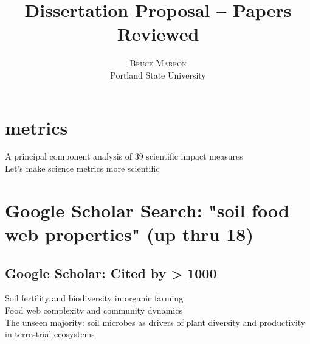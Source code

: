 \documentclass[twoside]{article}	%
\title{\vspace{-15mm}\fontsize{14pt}{10pt}\selectfont\textbf{Dissertation Proposal -- Papers Reviewed}} %
\author{
\large
\textsc{Bruce Marron} \\ %
\normalsize Portland State University \\ %
\vspace{-5mm}
}
\date{}
\begin{document}
\maketitle %
\thispagestyle{fancy} %


\begin{abstract}

\end{abstract}


\section{metrics}
 A principal component analysis of 39 scientific impact measures\\
 Let's make science metrics more scientific\\

\section{Google Scholar Search: "soil food web properties" (up thru 18)}
\subsection{Google Scholar: Cited by > 1000}
 Soil fertility and biodiversity in organic farming\\
 Food web complexity and community dynamics\\
 The unseen majority: soil microbes as drivers of plant diversity and productivity in terrestrial ecosystems\\
\end{document}
